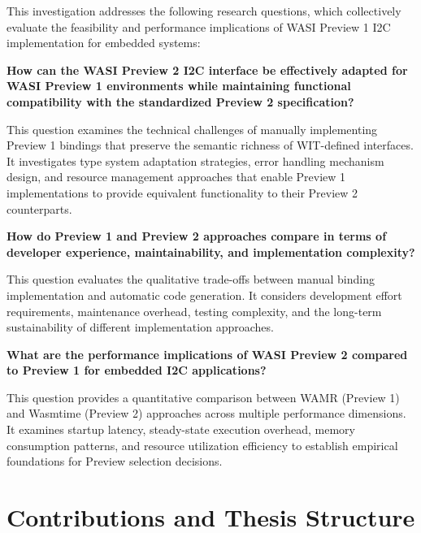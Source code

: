 This investigation addresses the following research questions, which collectively evaluate the feasibility and performance implications of WASI Preview 1 I2C implementation for embedded systems:

\begin{researchquestion}\label{rq1}
\textbf{How can the WASI Preview 2 I2C interface be effectively adapted for WASI Preview 1 environments while maintaining functional compatibility with the standardized Preview 2 specification?}
\end{researchquestion}

This question examines the technical challenges of manually implementing Preview 1 bindings that preserve the semantic richness of WIT-defined interfaces. It investigates type system adaptation strategies, error handling mechanism design, and resource management approaches that enable Preview 1 implementations to provide equivalent functionality to their Preview 2 counterparts.

\begin{researchquestion}\label{rq2}
\textbf{How do Preview 1 and Preview 2 approaches compare in terms of developer experience, maintainability, and implementation complexity?}
\end{researchquestion}

This question evaluates the qualitative trade-offs between manual binding implementation and automatic code generation. It considers development effort requirements, maintenance overhead, testing complexity, and the long-term sustainability of different implementation approaches.

\begin{researchquestion}\label{rq3}
\textbf{What are the performance implications of WASI Preview 2 compared to Preview 1 for embedded I2C applications?}
\end{researchquestion}

This question provides a quantitative comparison between WAMR (Preview 1) and Wasmtime (Preview 2) approaches across multiple performance dimensions. It examines startup latency, steady-state execution overhead, memory consumption patterns, and resource utilization efficiency to establish empirical foundations for Preview selection decisions.




\section{Contributions and Thesis Structure}
\label{sec:contributions-structure}

